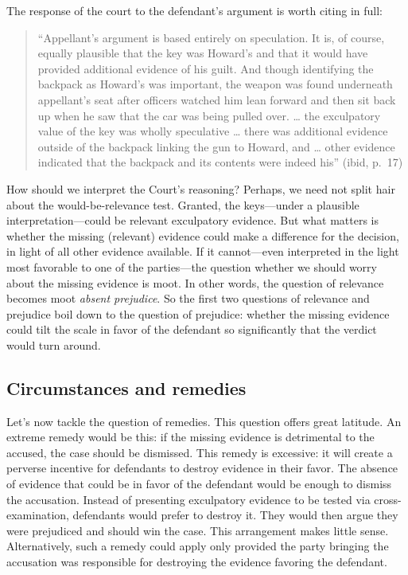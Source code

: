 \documentclass[
  10pt,
  dvipsnames,enabledeprecatedfontcommands]{scrartcl}
\begin{document}
The response of the court to the defendant's argument is worth citing in
full:

\begin{quote}
``Appellant's argument is based entirely on speculation. It is, of
course, equally plausible that the key was Howard's and that it would
have provided additional evidence of his guilt. And though identifying
the backpack as Howard's was important, the weapon was found underneath
appellant's seat after officers watched him lean forward and then sit
back up when he saw that the car was being pulled over. \ldots{} the
exculpatory value of the key was wholly speculative \ldots{} there was
additional evidence outside of the backpack linking the gun to Howard,
and \ldots{} other evidence indicated that the backpack and its contents
were indeed his'' (ibid, p.~17)
\end{quote}

\noindent How should we interpret the Court's reasoning? Perhaps, we
need not split hair about the would-be-relevance test. Granted, the
keys---under a plausible interpretation---could be relevant exculpatory
evidence. But what matters is whether the missing (relevant) evidence
could make a difference for the decision, in light of all other evidence
available. If it cannot---even interpreted in the light most favorable
to one of the parties---the question whether we should worry about the
missing evidence is moot. In other words, the question of relevance
becomes moot \emph{absent prejudice}. So the first two questions of
relevance and prejudice boil down to the question of prejudice: whether
the missing evidence could tilt the scale in favor of the defendant so
significantly that the verdict would turn around.

\hypertarget{circumstances-and-remedies}{%
\subsection{Circumstances and
remedies}\label{circumstances-and-remedies}}

Let's now tackle the question of remedies. This question offers great
latitude. An extreme remedy would be this: if the missing evidence is
detrimental to the accused, the case should be dismissed. This remedy is
excessive: it will create a perverse incentive for defendants to destroy
evidence in their favor. The absence of evidence that could be in favor
of the defendant would be enough to dismiss the accusation. Instead of
presenting exculpatory evidence to be tested via cross-examination,
defendants would prefer to destroy it. They would then argue they were
prejudiced and should win the case. This arrangement makes little sense.
Alternatively, such a remedy could apply only provided the party
bringing the accusation was responsible for destroying the evidence
favoring the defendant.
\end{document}
